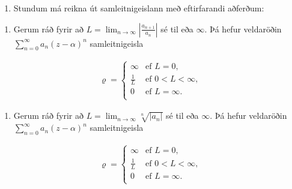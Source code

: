 \documentclass[a4paper,10pt,icelandic]{sphinxmanual}
\begin{document}
\begin{enumerate}
%
\setcounter{enumi}{2}
\item {} 
Stundum má reikna út samleitnigeislann með eftirfarandi aðferðum:

\end{enumerate}
\begin{enumerate}
%
\item {} 
Gerum ráð fyrir að \(L=\lim_{n\rightarrow\infty}\left|\frac{a_{n+1}}{a_n}\right|\) sé til eða \(\infty\). Þá hefur veldaröðin \(\sum_{n=0}^\infty a_n(z-\alpha)^n\) samleitnigeisla

\end{enumerate}
\begin{equation*}
\begin{split}\varrho=\left\{\begin{array}{ll}
\infty & \text{ef }L=0,\\
\frac{1}{L} & \text{ef }0<L<\infty,\\
0 & \text{ef }L=\infty.\\
\end{array}
\right.\end{split}
\end{equation*}\begin{enumerate}
%
\setcounter{enumi}{1}
\item {} 
Gerum ráð fyrir að \(L=\lim_{n\rightarrow\infty}\sqrt[n]{|a_n|}\) sé til eða \(\infty\). Þá hefur veldaröðin \(\sum_{n=0}^\infty a_n(z-\alpha)^n\) samleitnigeisla

\end{enumerate}
\begin{equation*}
\begin{split}\varrho=\left\{\begin{array}{ll}
\infty & \mbox{ef }L=0,\\
\frac{1}{L} & \mbox{ef }0<L<\infty,\\
0 & \mbox{ef }L=\infty.\\
\end{array}
\right.\end{split}
\end{equation*}
\end{document}
